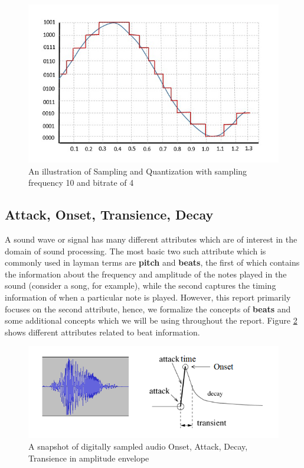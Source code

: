 \documentclass[10pt]{article}
\begin{document}
\begin{figure}
    \centering
    \includegraphics{quantization.jpg}
    \caption{An illustration of Sampling and Quantization with sampling frequency 10 and bitrate of 4}
    \label{fig:samp-quant}
\end{figure}



\subsection{Attack, Onset, Transience, Decay}

A sound wave or signal has many different attributes which are of interest in the domain of sound processing. The most basic two such attribute which is commonly used in layman terms are \textbf{pitch} and \textbf{beats}, the first of which contains the information about the frequency and amplitude of the notes played in the sound (consider a song, for example), while the second captures the timing information of when a particular note is played. However, this report primarily focuses on the second attribute, hence, we formalize the concepts of \textbf{beats} and some additional concepts which we will be using throughout the report. Figure \ref{fig:onset-defn} shows different attributes related to beat information.

\begin{figure}
    \centering
    \includegraphics{onset_defn.png}
    \caption{A snapshot of digitally sampled audio\qquad
    Onset, Attack, Decay, Transience in amplitude envelope}
    \label{fig:onset-defn}
\end{figure}
\end{document}
